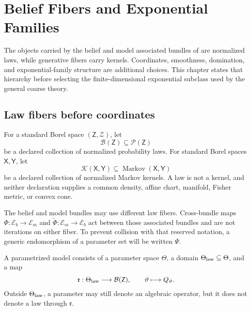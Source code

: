 \chapter{Belief Fibers and Exponential Families}
\label{ch:expfamily}

The objects carried by the belief and model associated bundles of
 are normalized laws, while generative fibers carry kernels.
Coordinates, smoothness, domination, and exponential-family structure are
additional choices. This chapter states that hierarchy before selecting the
finite-dimensional exponential subclass used by the general coarse theory.

\section{Law fibers before coordinates}
\label{sec:exp-general-fibers}

For a standard Borel space \((\mathsf Z,\mathscr Z)\), let
\begin{equation}
\mathcal B(\mathsf Z)\subseteq\mathcal P(\mathsf Z)
\label{eq:exp-law-fiber}
\end{equation}
be a declared collection of normalized probability laws. For standard Borel
spaces \(\mathsf X,\mathsf Y\), let
\begin{equation}
\mathcal K(\mathsf X,\mathsf Y)
\subseteq\operatorname{Markov}(\mathsf X,\mathsf Y)
\label{eq:exp-kernel-fiber}
\end{equation}
be a declared collection of normalized Markov kernels. A law is not a kernel,
and neither declaration supplies a common density, affine chart, manifold,
Fisher metric, or convex cone. 

The belief and model bundles may use different law fibers. Cross-bundle maps
\(\Phi:\mathcal E_b\to\mathcal E_m\) and
\(\widetilde\Phi:\mathcal E_m\to\mathcal E_b\) act between those associated
bundles and are not iterations on either fiber. To prevent collision with
that reserved notation, a generic endomorphism of a parameter set will be
written \(\Psi\).

A parametrized model consists of a parameter space \(\Theta\), a domain
\(\Theta_{\rm law}\subseteq\Theta\), and a map
\begin{equation}
\mathfrak r:\Theta_{\rm law}\longrightarrow\mathcal B(\mathsf Z),
\qquad
\vartheta\longmapsto Q_\vartheta .
\label{eq:exp-realization-map}
\end{equation}
Outside \(\Theta_{\rm law}\), a parameter may still denote an algebraic
operator, but it does not denote a law through \(\mathfrak r\).


